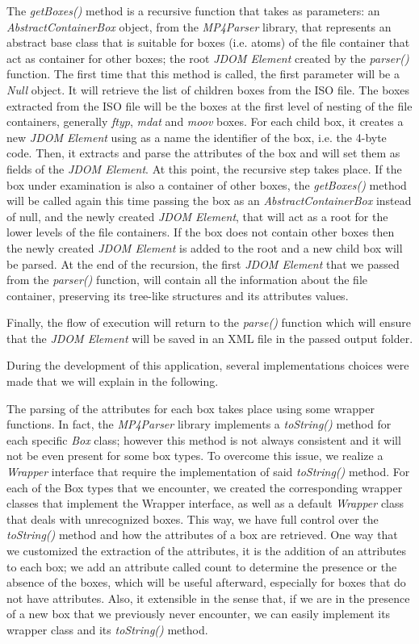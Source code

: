 The \emph{getBoxes()} method is a recursive function that takes as parameters: an \emph{AbstractContainerBox} object, from the \emph{MP4Parser} library, that represents an abstract base class that is suitable for boxes (i.e. atoms) of the file container that act as container for other boxes; the root \emph{JDOM Element} created by the \emph{parser()} function.
The first time that this method is called, the first parameter will be a \emph{Null} object. It will retrieve the list of children boxes from the ISO file. The boxes extracted from the ISO file will be the boxes at the first level of nesting of the file containers, generally \emph{ftyp}, \emph{mdat} and \emph{moov} boxes.
For each child box, it creates a new \emph{JDOM Element} using as a name the identifier of the box, i.e. the 4-byte code. Then, it extracts and parse the attributes of the box and will set them as fields of the \emph{JDOM Element}. At this point, the recursive step takes place. If the box under examination is also a container of other boxes, the \emph{getBoxes()} method will be called again this time passing the box as an \emph{AbstractContainerBox} instead of null, and the newly created \emph{JDOM Element}, that will act as a root for the lower levels of the file containers. If the box does not contain other boxes then the newly created \emph{JDOM Element} is added to the root and a new child box will be parsed.
At the end of the recursion, the first \emph{JDOM Element} that we passed from the \emph{parser()} function, will contain all the information about the file container, preserving its tree-like structures and its attributes values.

Finally, the flow of execution will return to the \emph{parse()} function which will ensure that the \emph{JDOM Element} will be saved in an XML file in the passed output folder.

During the development of this application, several implementations choices were made that we will explain in the following.

The parsing of the attributes for each box takes place using some wrapper functions. In fact, the \emph{MP4Parser} library implements a \emph{toString()} method for each specific \emph{Box} class; however this method is not always consistent and it will not be even present for some box types. To overcome this issue, we realize a \emph{Wrapper} interface that require the implementation of said \emph{toString()} method. For each of the Box types that we encounter, we created the corresponding wrapper classes that implement the Wrapper interface, as well as a default \emph{Wrapper} class that deals with unrecognized boxes. This way, we have full control over the \emph{toString()} method and how the attributes of a box are retrieved. One way that we customized the extraction of the attributes, it is the addition of an attributes to each box; we add an attribute called count to determine the presence or the absence of the boxes, which will be useful afterward, especially for boxes that do not have attributes.
Also, it extensible in the sense that, if we are in the presence of a new box that we previously never encounter, we can easily implement its wrapper class and its \emph{toString()} method.


